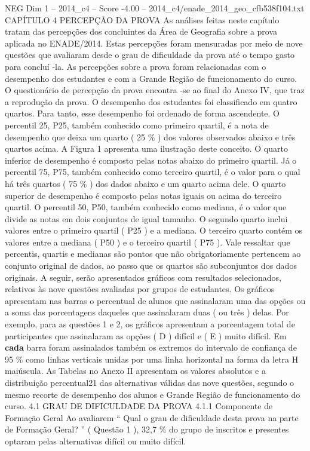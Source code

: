 \begin{textsample}{NEG Dim 1 – 2014\_c4 – Score -4.00 – 2014\_c4/enade\_2014\_geo\_cfb538f104.txt}  \label{ex:f1_neg_123}
CAPÍTULO 4 PERCEPÇÃO DA PROVA As análises feitas neste capítulo tratam das percepções dos concluintes da Área de Geografia sobre a prova aplicada no ENADE/2014.
Estas percepções foram mensuradas por meio de nove questões que avaliaram desde o grau de dificuldade da prova até o tempo gasto para concluí -la.
As percepções sobre a prova foram relacionadas com o desempenho dos estudantes e com a Grande Região de funcionamento do curso.
O questionário de percepção da prova encontra -se ao final do Anexo IV, que traz a reprodução da prova.
O desempenho dos estudantes foi classificado em quatro quartos.
Para tanto, esse desempenho foi ordenado de forma ascendente.
O percentil 25, P25, também conhecido como primeiro quartil, é a nota de desempenho que deixa um quarto ( 25 \% ) dos valores observados abaixo e três quartos acima.
A Figura 1 apresenta uma ilustração deste conceito.
O quarto inferior de desempenho é composto pelas notas abaixo do primeiro quartil.
Já o percentil 75, P75, também conhecido como terceiro quartil, é o valor para o qual há três quartos ( 75 \% ) dos dados abaixo e um quarto acima dele.
O quarto superior de desempenho é composto pelas notas iguais ou acima do terceiro quartil.
O percentil 50, P50, também conhecido como mediana, é o valor que divide as notas em dois conjuntos de igual tamanho.
O segundo quarto inclui valores entre o primeiro quartil ( P25 ) e a mediana.
O terceiro quarto contém os valores entre a mediana ( P50 ) e o terceiro quartil ( P75 ).
Vale ressaltar que percentis, quartis e medianas são pontos que não obrigatoriamente pertencem ao conjunto original de dados, ao passo que os quartos são subconjuntos dos dados originais.
A seguir, serão apresentados gráficos com resultados selecionados, relativos às nove questões avaliadas por grupos de estudantes.
Os gráficos apresentam nas barras o percentual de alunos que assinalaram uma das opções ou a soma das porcentagens daqueles que assinalaram duas ( ou três ) delas.
Por exemplo, para as questões 1 e 2, os gráficos apresentam a porcentagem total de participantes que assinalaram as opções ( D ) difícil e ( E ) muito difícil.
Em \textbf{cada} barra foram assinalados também os extremos do intervalo de confiança de 95 \% como linhas verticais unidas por uma linha horizontal na forma da letra H maiúscula.
As Tabelas no Anexo II apresentam os valores absolutos e a distribuição percentual21 das alternativas válidas das nove questões, segundo o mesmo recorte de desempenho dos alunos e Grande Região de funcionamento do curso. 4.1 GRAU DE DIFICULDADE DA PROVA 4.1.1 Componente de Formação Geral Ao avaliarem “ Qual o grau de dificuldade desta prova na parte de Formação Geral? ” ( Questão 1 ), 32,7 \% do grupo de inscritos e presentes optaram pelas alternativas difícil ou muito difícil.

\end{textsample}
